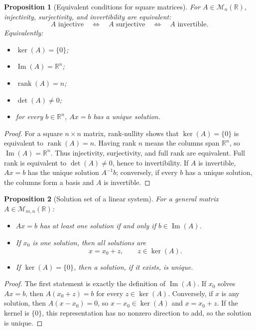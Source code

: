 \documentclass[10pt]{article}
\theoremstyle{compactdefinition}
\theoremstyle{compactproposition}
\newtheorem{proposition}{Proposition}[section]
\newcommand{\R}{\mathbb{R}}
\newcommand{\M}{\mathcal{M}}
\newcommand{\rank}{\operatorname{rank}}
\newcommand{\im}{\operatorname{Im}}
\begin{document}
\begin{proposition}[Equivalent conditions for square matrices]
For $A\in\M_n(\R)$, injectivity, surjectivity, and invertibility are equivalent:
\[
A\text{ injective}
\quad\Longleftrightarrow\quad
A\text{ surjective}
\quad\Longleftrightarrow\quad
A\text{ invertible}.
\]
Equivalently:
\begin{itemize}
\item $\ker(A)=\{0\}$;
\item $\im(A)=\R^n$;
\item $\rank(A)=n$;
\item $\det(A)\neq0$;
\item for every $b\in\R^n$, $Ax=b$ has a unique solution.
\end{itemize}
\end{proposition}

\begin{proof}
For a square $n\times n$ matrix, rank-nullity shows that
$\ker(A)=\{0\}$ is equivalent to $\rank(A)=n$. Having rank $n$ means the columns
span $\R^n$, so $\im(A)=\R^n$. Thus injectivity, surjectivity, and full rank are
equivalent. Full rank is equivalent to $\det(A)\neq0$, hence to invertibility.
If $A$ is invertible, $Ax=b$ has the unique solution $A^{-1}b$; conversely, if
every $b$ has a unique solution, the columns form a basis and $A$ is invertible.
\end{proof}

\begin{proposition}[Solution set of a linear system]
For a general matrix $A\in\M_{m,n}(\R)$:
\begin{itemize}
\item $Ax=b$ has at least one solution if and only if $b\in\im(A)$.
\item If $x_0$ is one solution, then all solutions are
\[
x=x_0+z,
\qquad z\in\ker(A).
\]
\item If $\ker(A)=\{0\}$, then a solution, if it exists, is unique.
\end{itemize}
\end{proposition}

\begin{proof}
The first statement is exactly the definition of $\im(A)$. If $x_0$ solves
$Ax=b$, then $A(x_0+z)=b$ for every $z\in\ker(A)$. Conversely, if $x$ is any
solution, then $A(x-x_0)=0$, so $x-x_0\in\ker(A)$ and $x=x_0+z$. If the kernel
is $\{0\}$, this representation has no nonzero direction to add, so the
solution is unique.
\end{proof}
\end{document}
